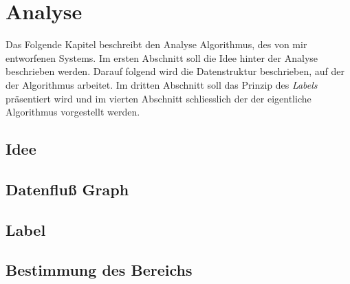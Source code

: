 \chapter{Analyse}

Das Folgende Kapitel beschreibt den Analyse Algorithmus, des von mir entworfenen Systems.
Im ersten Abschnitt soll die Idee hinter der Analyse beschrieben werden. Darauf folgend
wird die Datenstruktur beschrieben, auf der der Algorithmus arbeitet. Im dritten Abschnitt
soll das Prinzip des \textit{Labels} präsentiert wird und im vierten Abschnitt schliesslich 
der der eigentliche Algorithmus vorgestellt werden. 

\section{Idee}

\section{Datenfluß Graph}

\section{Label}

\section{Bestimmung des Bereichs}

